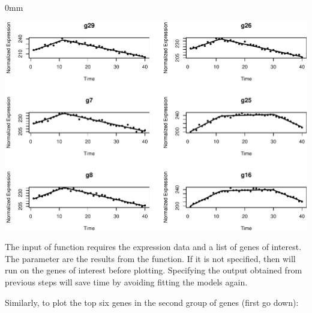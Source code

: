 \documentclass{article}
\begin{document}
\begin{knitrout}
\color{fgcolor}\begin{kframe}
\begin{alltt}
\hlstd{(}\hlstd{=}\hlstd{(}\hlstd{,}\hlstd{))}
 \hlkwb{<-} 
                     \hlstd{=} \hlopt{$}\hlstd{firstup)[}\hlopt{:}\hlstd{],}
                     
\end{alltt}
\end{kframe}\begin{adjustwidth}{\fltoffset}{0mm}

{\centering \includegraphics[width=1\textwidth]{figure/unnamed-chunk-10-1} 

}

\end{adjustwidth}
\end{knitrout}

The input of function  requires the expression data and
a list of genes of interest.
The parameter  are the results from the  
function.
If it is not specified, then  will run 
 on the genes of interest before plotting.
Specifying the output obtained from previous steps will save time by avoiding 
fitting the models again.

Similarly, to plot the top six genes in the second group of genes (first go 
down):
\end{document}
